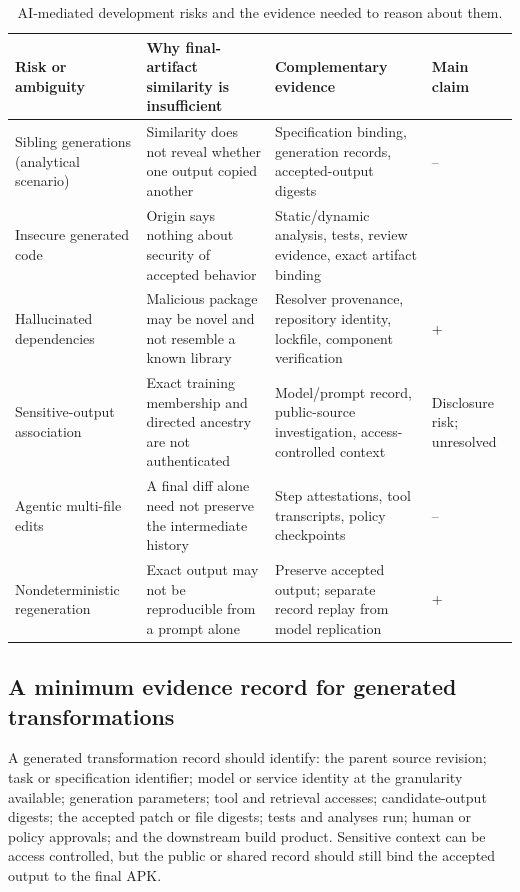 \begin{table}[t]
\caption{AI-mediated development risks and the evidence needed to reason about them.}
\label{tab:ai-risks}
\footnotesize
\begin{tabularx}{\textwidth}{L{2.35cm}Y Y L{1.6cm}}
\toprule
Risk or ambiguity & Why final-artifact similarity is insufficient & Complementary evidence & Main claim \\
\midrule
Sibling generations (analytical scenario)~\cite{text2app,appforge} & Similarity does not reveal whether one output copied another & Specification binding, generation records, accepted-output digests & -- \\
Insecure generated code~\cite{pearce,perry,sandoval} & Origin says nothing about security of accepted behavior & Static/dynamic analysis, tests, review evidence, exact artifact binding &  \\
Hallucinated dependencies~\cite{spracklen} & Malicious package may be novel and not resemble a known library & Resolver provenance, repository identity, lockfile, component verification & + \\
Sensitive-output association~\cite{codexleaks} & Exact training membership and directed ancestry are not authenticated & Model/prompt record, public-source investigation, access-controlled context & Disclosure risk;  unresolved \\
Agentic multi-file edits~\cite{appforge} & A final diff alone need not preserve the intermediate history & Step attestations, tool transcripts, policy checkpoints & -- \\
Nondeterministic regeneration & Exact output may not be reproducible from a prompt alone & Preserve accepted output; separate record replay from model replication & + \\
\bottomrule
\end{tabularx}
\end{table}

\subsection{A minimum evidence record for generated transformations}

A generated transformation record should identify: the parent source revision; task or specification identifier; model or service identity at the granularity available; generation parameters; tool and retrieval accesses; candidate-output digests; the accepted patch or file digests; tests and analyses run; human or policy approvals; and the downstream build product. Sensitive context can be access controlled, but the public or shared record should still bind the accepted output to the final APK.

